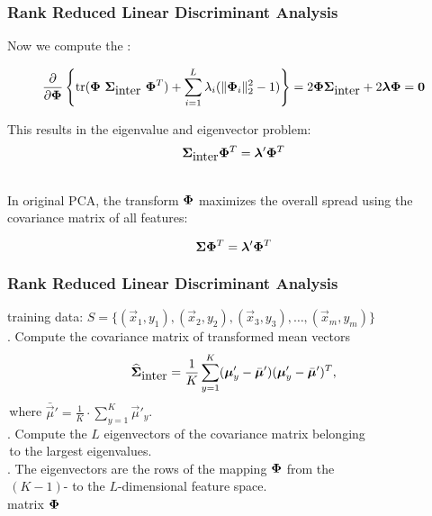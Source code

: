 \begin{frame}
	\frametitle{Rank Reduced Linear Discriminant Analysis \cont}

	Now we compute the :

	\begin{displaymath}
		\frac{\partial}{\partial{\ensuremath{{\bm \Phi}}}}
		\left\{
		\mbox{tr} ({\bm \Phi} \ {\bm \Sigma}_{\mbox{inter}}  \ {\bm \Phi}^T) + \sum_{i=1}^{L} \lambda_i (\| {\bm \Phi}_i \|^2_2 - 1)  \right\} =
		2 {\bm \Phi}{\bm \Sigma}_{\mbox{inter}} +2 {\bm \lambda} {\bm \Phi} = {\bm 0}
	\end{displaymath}
	\pspread

	This results in the eigenvalue and eigenvector problem:
	\begin{displaymath}
		{\bm \Sigma}_{\mbox{inter}} {\bm \Phi}^T = {\bm \lambda}' {\bm \Phi}^T
	\end{displaymath}
	\pspread

	 \\
	In original PCA, the transform ${\bm \Phi}$ maximizes the overall spread using the covariance matrix of all features:

	\begin{displaymath}
		{\bm \Sigma} {\bm \Phi}^T = {\bm \lambda}' {\bm \Phi}^T
	\end{displaymath}
\end{frame}


\begin{frame}
	\frametitle{Rank Reduced Linear Discriminant Analysis \cont}

	\begin{algorithmic}
		\STATE  {} training data:  $S = \{ (\vec x_1, y_1), (\vec x_2, y_2), (\vec x_3, y_3), \dots, (\vec x_m, y_m) \}$ \\[.3cm]
		. Compute the covariance matrix of transformed mean vectors
		$$\widehat{{\bm \Sigma}}_{\mbox{inter}} =
			\frac{1}{K} \sum_{y=1}^K ({\bm \mu}'_y - \bar{{\bm \mu}}')({\bm \mu}'_y - \bar{{\bm \mu}}')^T,$$
		\quad\,where $\bar{\vec \mu}' = \frac{1}{K} \cdot \sum_{y=1}^{K}\vec\mu'_y$. \\[.3cm]
		\pause
		. Compute the $L$ eigenvectors of the covariance matrix belonging \\
		\quad\,to the largest eigenvalues. \\[.3cm]
		\pause
		. The eigenvectors are the rows of the mapping ${\bm \Phi}$ from the \\
		\quad\,$(K-1)$- to the $L$-dimensional feature space. \\[.3cm]
		\STATE  {} matrix ${\bm \Phi}$
	\end{algorithmic}
\end{frame}

